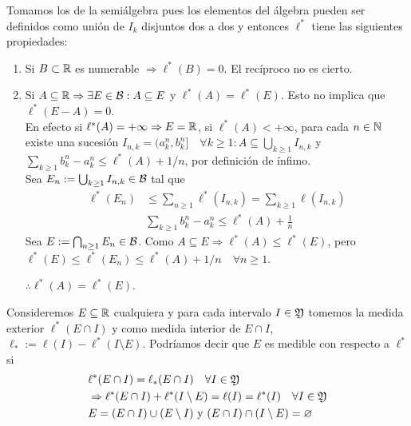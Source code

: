Tomamos los de la semiálgebra pues los elementos del álgebra pueden ser definidos como unión de $I_k$ disjuntos dos a dos y entonces $\ell^*$ tiene las siguientes propiedades:
\begin{enumerate}
    \item Si $B \subset \mathbb{R}$ es numerable $\Rightarrow \ell^*(B) = 0$. El recíproco no es cierto.
    \item Si $A \subseteq \mathbb{R} \Rightarrow \exists E \in \mathcal{B} : A \subseteq E$ y $\ell^*(A) = \ell^*(E)$. Esto no implica que $\ell^*(E-A) = 0$. \\
          En efecto si $\ell^*(A) = +\infty \Rightarrow E = \mathbb{R}$, si $\ell^*(A) < +\infty$, para cada $n \in \mathbb{N}$ existe una sucesión $I_{n, k} = (a_k^n, b_k^n] \quad \forall k \geq 1 :
              A \subseteq \bigcup_{k \geq 1} I_{n, k}$ y $\sum_{k \geq 1} b_k^n - a_k^n \leq \ell^*(A) + 1/n$, por definición de ínfimo. \\
          Sea $E_n := \bigcup_{k \geq 1} I_{n, k} \in \mathcal{B}$ tal que \begin{align*}
              \ell^*(E_n) & \leq \sum_{n \geq 1} \ell^*(I_{n, k}) = \sum_{k \geq 1} \ell(I_{n, k}) \\
                          & \sum_{k \geq 1} b_k^n - a_k^n \leq \ell^*(A) + \frac{1}{n}
          \end{align*}
          Sea $E := \bigcap_{n \geq 1} E_n \in \mathcal{B}$. Como $A \subseteq E \Rightarrow \ell^*(A) \leq \ell^*(E)$, pero $\ell^*(E) \leq \ell^*(E_n) \leq \ell^*(A) + 1/n \quad \forall n \geq 1$.

          $\therefore \ell^*(A) = \ell^*(E)$.
\end{enumerate}

\begin{note}
    Consideremos $E \subseteq \mathbb{R}$ cualquiera y para cada intervalo $I \in \mathfrak{Y}$ tomemos la medida exterior $\ell^*(E \cap I)$ y como medida interior
    de $E \cap I$, $\ell_* := \ell(I) - \ell^*(I \setminus E)$. Podríamos decir que $E$ es medible con respecto a $\ell^*$ si \begin{align*}
         & \ell^*(E \cap I) = \ell_*(E \cap I) \quad \forall I \in \mathfrak{Y}                                        \\
         & \Rightarrow \ell^*(E \cap I) + \ell^*(I \setminus E) = \ell(I) = \ell^*(I) \quad \forall I \in \mathfrak{Y} \\
         & E = (E \cap I) \cup (E \setminus I) \text{ y } (E \cap I) \cap (I \setminus E) = \varnothing
    \end{align*}
\end{note}

